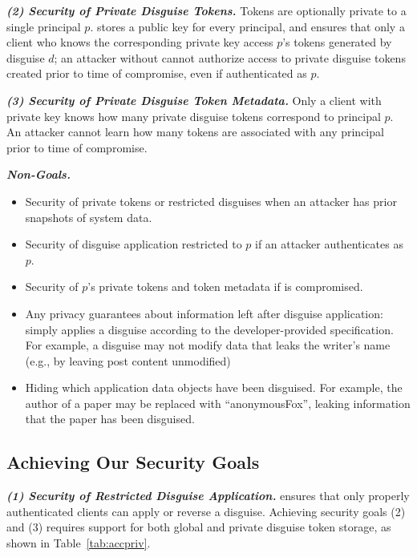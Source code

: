 \vspace{6pt}\noindent\textbf{\emph{(2) Security of Private Disguise Tokens.}}
Tokens are optionally private to a single principal $p$. 
\sys stores a public key  for every principal, and ensures that 
only a client who knows the corresponding private key  access $p$'s
tokens generated by disguise $d$; an
attacker without  cannot authorize access to private disguise tokens created prior to time
of compromise, even if authenticated as $p$.

\vspace{6pt}\noindent\textbf{\emph{(3) Security of Private Disguise Token Metadata.}}
Only a client with private key  knows how many private disguise tokens correspond to
principal $p$. An attacker cannot learn how many tokens are associated with any principal prior to
time of compromise.

\vspace{6pt}\noindent\textbf{\emph{Non-Goals.}}
\begin{itemize}
    \item Security of private tokens or restricted disguises when an attacker has prior snapshots of system data.
    \item Security of disguise application restricted to $p$ if an attacker authenticates as $p$.
    \item Security of $p$'s private tokens and token metadata if  is compromised.  
    \item Any privacy guarantees about information left after disguise application: \sys 
        simply applies a disguise according to the developer-provided specification.
        For example, a disguise may not modify data that leaks the writer's name (e.g., by leaving post content unmodified)
    \item Hiding which application data objects have been disguised. For example, the author of a
        paper may be replaced with ``anonymousFox'', leaking information that the paper has been
        disguised.
\end{itemize}

\subsection{Achieving Our Security Goals}
\vspace{6pt}\noindent\textbf{\emph{(1) Security of Restricted Disguise Application.}}
\sys ensures that only properly authenticated clients can apply or
reverse a disguise.  Achieving security goals (2) and (3) requires support for both global and
private disguise token storage, as shown in Table~\ref{tab:accpriv}.

